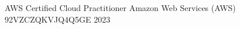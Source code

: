 

\begin{cvhonors}

  \cvhonor
    {AWS Certified Cloud Practitioner} %
    {Amazon Web Services (AWS)} %
    {92VZCZQKVJQ4Q5GE} %
    {2023} %

\end{cvhonors}
